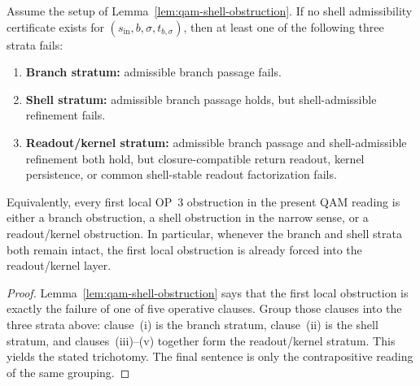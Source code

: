 \begin{lemma}\label{lem:qam-shell-obstruction-stratification}
Assume the setup of Lemma~\ref{lem:qam-shell-obstruction}. If no shell admissibility certificate exists for $(s_{\mathrm{in}},b,\sigma,t_{b,\sigma})$, then at least one of the following three strata fails:
\begin{enumerate}[leftmargin=2em,label=(\arabic*)]
 \item \textbf{Branch stratum:} admissible branch passage fails.
 \item \textbf{Shell stratum:} admissible branch passage holds, but shell-admissible refinement fails.
 \item \textbf{Readout/kernel stratum:} admissible branch passage and shell-admissible refinement both hold, but closure-compatible return readout, kernel persistence, or common shell-stable readout factorization fails.
\end{enumerate}
Equivalently, every first local OP~3 obstruction in the present QAM reading is either a branch obstruction, a shell obstruction in the narrow sense, or a readout/kernel obstruction. In particular, whenever the branch and shell strata both remain intact, the first local obstruction is already forced into the readout/kernel layer.
\end{lemma}

\begin{proof}
Lemma~\ref{lem:qam-shell-obstruction} says that the first local obstruction is exactly the failure of one of five operative clauses. Group those clauses into the three strata above: clause~(i) is the branch stratum, clause~(ii) is the shell stratum, and clauses~(iii)--(v) together form the readout/kernel stratum. This yields the stated trichotomy. The final sentence is only the contrapositive reading of the same grouping.
\end{proof}

